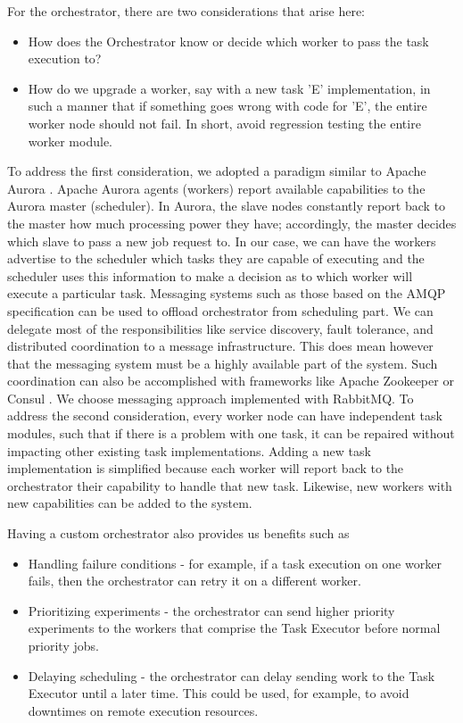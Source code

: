 \documentclass[review]{elsarticle}
\begin{document}
For the orchestrator, there are two considerations that arise here:
\begin{itemize}
\item How does the Orchestrator know or decide which worker to pass the task execution to?
\item How do we upgrade a worker, say with a new task 'E' implementation, in such a manner that if something goes wrong with code for 'E', the entire worker node should not fail. In short, avoid regression testing the entire worker module.
\end{itemize}

To address the first consideration, we adopted a paradigm similar to Apache Aurora \cite{apacheAurora}.  Apache Aurora agents (workers) report available capabilities to the Aurora master (scheduler). In Aurora, the slave nodes constantly report back to the master how much processing power they have; accordingly, the master decides which slave to pass a new job request to. In our case, we can have the workers advertise to the scheduler which tasks they are capable of executing and the scheduler uses this information to make a decision as to which worker will execute a particular task.
Messaging systems such as those based on the AMQP specification can be used to offload orchestrator from scheduling part. We can delegate most of the responsibilities like service discovery, fault tolerance, and distributed coordination to a message infrastructure. This does mean however that the messaging system must be a highly available part of the system. Such coordination can also be accomplished with  frameworks like Apache Zookeeper \cite{hunt2010zookeeper} or Consul \cite{vargo2016consul}. We choose messaging approach implemented with RabbitMQ. 
To address the second consideration, every worker node can have independent task modules, such that if there is a problem with one task, it can be repaired without impacting other existing task implementations. Adding a new task implementation is simplified because each worker will report back to the orchestrator their capability to handle that new task. Likewise, new workers with new capabilities can be added to the system.  

Having a custom orchestrator also provides us benefits such as
\begin{itemize}
\item Handling failure conditions - for example, if a task execution on one worker fails, then the orchestrator can retry it on a different worker.
\item Prioritizing experiments - the orchestrator can send higher priority experiments to the workers that comprise the Task Executor before normal priority jobs.  
\item Delaying scheduling - the orchestrator can delay sending work to the Task Executor until a later time.   This could be used, for example, to avoid downtimes on remote execution resources. 
\end{itemize}
\end{document}
